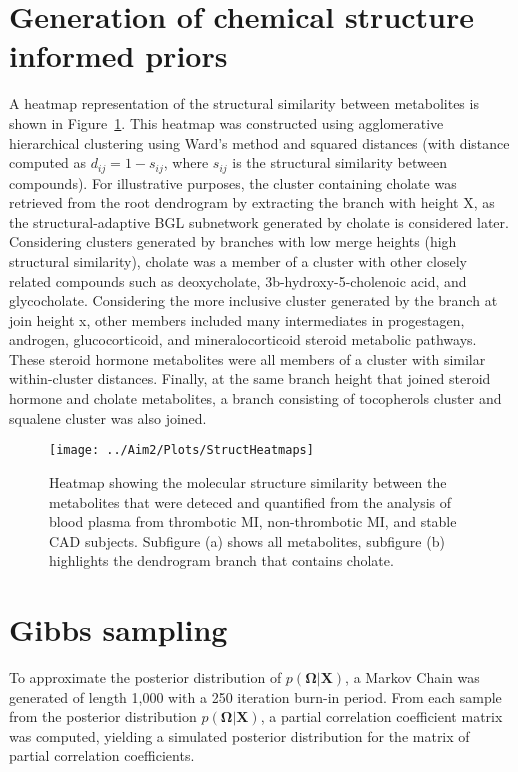 \begin{DoubleSpace*}
\section{Generation of chemical structure informed priors}
A heatmap representation of the structural similarity between metabolites is shown in Figure~\ref{fig:heatmap}. This heatmap was constructed using agglomerative hierarchical clustering using Ward’s method and squared distances (with distance computed as $d_{ij}=1-s_{ij}$, where $s_{ij}$ is the structural similarity between compounds). For illustrative purposes, the cluster containing cholate was retrieved from the root dendrogram by extracting the branch with height X, as the structural-adaptive BGL subnetwork generated by cholate is considered later. Considering clusters generated by branches with low merge heights (high structural similarity), cholate was a member of a cluster with other closely related compounds such as deoxycholate, 3b-hydroxy-5-cholenoic acid, and glycocholate. Considering the more inclusive cluster generated by the branch at join height x, other members included many intermediates in progestagen, androgen, glucocorticoid, and mineralocorticoid steroid metabolic pathways. These steroid hormone metabolites were all members of a cluster with similar within-cluster distances. Finally, at the same branch height that joined steroid hormone and cholate metabolites, a branch consisting of tocopherols cluster and squalene cluster was also joined.

\begin{landscape}
\begin{figure}[H]
	\texttt{[image: ../Aim2/Plots/StructHeatmaps]}
	\caption[Heatmap showing the molecular structure similarity between the metabolites that were deteced and quantified from the analysis of blood plasma from thrombotic MI, non-thrombotic MI, and stable CAD subjects]{\DoubleSpacing Heatmap showing the molecular structure similarity between the metabolites that were deteced and quantified from the analysis of blood plasma from thrombotic MI, non-thrombotic MI, and stable CAD subjects. Subfigure (a) shows all metabolites, subfigure (b) highlights the dendrogram branch that contains cholate. \label{fig:heatmap} }
\end{figure}
\end{landscape}

\section{Gibbs sampling}
To approximate the posterior distribution of $p(\boldsymbol{\Omega}|\textbf{X})$, a Markov Chain was generated of length 1,000 with a 250 iteration burn-in period. From each sample from the posterior distribution $p(\boldsymbol{\Omega}|\textbf{X})$, a partial correlation coefficient matrix was computed, yielding a simulated posterior distribution for the matrix of partial correlation coefficients.


\end{DoubleSpace*}
